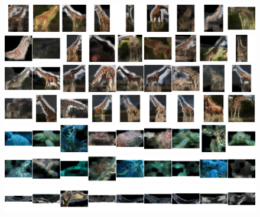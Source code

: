 \begin{figure}[!t]
    \begin{center}
        \includegraphics[width=0.78\linewidth]{resources/samples-image-giraffe_masai.pdf} \\
        \vspace{0.040cm}
        \includegraphics[width=0.78\linewidth]{resources/samples-image-giraffe_masai2.pdf} \\
        \vspace{0.040cm}
        \includegraphics[width=0.78\linewidth]{resources/samples-image-giraffe_reticulated.pdf} \\
        \vspace{0.040cm}
        \includegraphics[width=0.78\linewidth]{resources/samples-image-giraffe_reticulated2.pdf} \\
        \vspace{0.040cm}
        \includegraphics[width=0.78\linewidth]{resources/samples-image-turtle_sea.pdf} \\
        \vspace{0.040cm}
        \includegraphics[width=0.78\linewidth]{resources/samples-image-turtle_sea2.pdf} \\
        \vspace{-0.040cm}
        \includegraphics[width=0.78\linewidth]{resources/samples-image-whale_fluke.pdf} \\

\end{center}
\end{figure}
